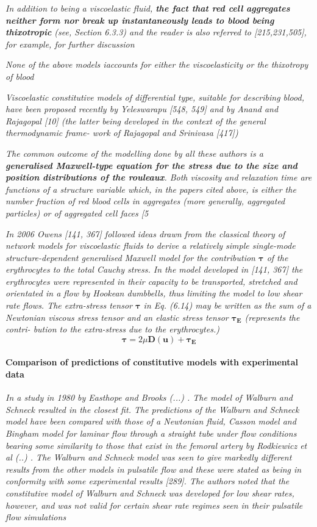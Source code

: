 \documentclass[11pt,letterpaper]{article}
\begin{document}
\textit{In addition to being a viscoelastic fluid, \textbf{the fact that red cell aggregates neither form nor break up instantaneously leads to blood being thixotropic }(see, Section 6.3.3) and the reader is also referred to [215,231,505], for example, for further discussion}


\textit{None of the above models iaccounts for either the viscoelasticity or the thixotropy of blood}



\textit{Viscoelastic constitutive models of differential type, suitable for describing blood, have been proposed recently by Yeleswarapu [548, 549] and by Anand and Rajagopal [10] (the latter being developed in the context of the general thermodynamic frame- work of Rajagopal and Srinivasa [417])}


\textit{The common outcome of the modelling done by all these authors is a \textbf{generalised Maxwell-type equation for the stress due to the size and position distributions of the rouleaux}. Both viscosity and relaxation time are functions of a structure variable which, in the papers cited above, is either the number fraction of red blood cells in aggregates (more generally, aggregated particles)  or of aggregated cell faces [5}

\textit{
In 2006 Owens [141, 367] followed ideas drawn from the classical theory
of network models for viscoelastic fluids to derive a relatively simple single-mode structure-dependent generalised Maxwell model for the contribution $\bm{\tau}$
of the erythrocytes to the total Cauchy stress. In the model developed in [141,
367] the erythrocytes were represented in their capacity to be transported,
stretched and orientated in a flow by Hookean dumbbells, thus limiting the
model to low shear rate flows. The extra-stress tensor $\bm{\tau}$ in Eq. (6.14) may be
written as the sum of a Newtonian viscous stress tensor and an elastic stress
tensor $\bm{\tau_E}$ (represents the contri- bution to the extra-stress due to the erythrocytes.) }\begin{equation}
    \bm{\tau}= 2\mu \bm{D}(\bm{u})+\bm{\tau_E}
\end{equation}

{\color{red} \paragraph{Comparison of predictions of constitutive models with experimental data}}
\textit{In a study in 1980 by Easthope and Brooks (...) . The model of Walburn and Schneck resulted in the closest fit. The predictions of the Walburn and Schneck model have been compared with those of a Newtonian fluid, Casson model and Bingham model for laminar flow through a straight tube under flow conditions bearing some similarity to those that exist in the femoral artery by Rodkiewicz et al (..) . The Walburn and Schneck model was seen to give markedly different results from the other models in pulsatile flow and these were stated as being in conformity with some experimental results [289]. The authors noted that the constitutive model of Walburn and Schneck was developed for low shear rates, however, and was not valid for certain shear rate regimes seen in their pulsatile flow simulations}
\end{document}
